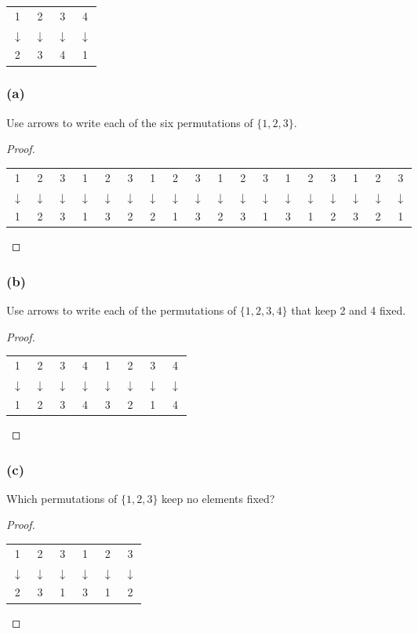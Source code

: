 \documentclass[14pt]{extarticle}
\newcommand{\cyda}{{\cy \(\downarrow\)}}
\newcommand{\cy}{\color{cyan}}
\begin{document}
\begin{center}
\begin{tabular}{cccc}
1&2&3&4 \\
\cyda & \cyda & \cyda & \cyda \\
2&3&4&1 \\
\end{tabular}
\end{center}

\subsubsection{(a)}
Use arrows to write each of the six permutations of \(\{1, 2, 3\}\).

\begin{proof}
\begin{center}
\begin{tabular}{ccc|ccc|ccc|ccc|ccc|ccc}
1&2&3&1&2&3&1&2&3&1&2&3&1&2&3&1&2&3 \\
\cyda & \cyda & \cyda & \cyda & \cyda & \cyda & \cyda & \cyda & \cyda & \cyda & \cyda & \cyda & \cyda & \cyda & 
\cyda & \cyda & \cyda & \cyda \\
1&2&3&1&3&2&2&1&3&2&3&1&3&1&2&3&2&1
\end{tabular}
\end{center}
\end{proof}

\subsubsection{(b)}
Use arrows to write each of the permutations of \(\{1, 2, 3, 4\}\) that keep 2 and 4 fixed.

\begin{proof}
\begin{center}
\begin{tabular}{cccc|cccc}
1&2&3&4&1&2&3&4 \\
\cyda & \cyda & \cyda & \cyda & \cyda & \cyda & \cyda & \cyda \\
1&2&3&4&3&2&1&4
\end{tabular}
\end{center}
\end{proof}

\subsubsection{(c)}
Which permutations of \(\{1, 2, 3\}\) keep no elements fixed?

\begin{proof}
\begin{center}
\begin{tabular}{ccc|ccc}
1&2&3&1&2&3 \\
\cyda & \cyda & \cyda & \cyda & \cyda & \cyda \\
2&3&1&3&1&2 \\
\end{tabular}
\end{center}
\end{proof}
\end{document}
